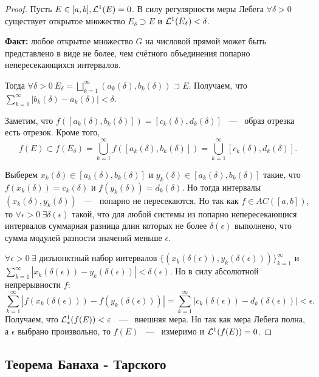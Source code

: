 \begin{proof}
    Пусть $E \in [a, b], \mathcal{L}^1(E) = 0$. В силу регулярности меры Лебега $\forall \delta > 0$ существует открытое множество $E_{\delta} \supset E$ и $\mathcal{L}^1(E_\delta) < \delta$. 

    \noindent \textbf{Факт:} любое открытое множество $G$ на числовой прямой может быть представлено в виде не более, чем счётного объединения попарно непересекающихся интервалов. 

    \noindent Тогда $\forall \delta > 0 \  E_{\delta} = \bigsqcup\limits_{k = 1}^{\infty} (a_k(\delta), b_k(\delta)) \supset E$. Получаем, что $\sum\limits_{k = 1}^{\infty} |b_k(\delta) - a_k(\delta)| < \delta$.

    \noindent Заметим, что $f([a_k(\delta), b_k(\delta)]) = [c_k(\delta), d_k(\delta)]$ ~---~ образ отрезка есть отрезок. Кроме того, $$f(E) \subset f(E_{\delta}) = \bigcup\limits_{k = 1}^{\infty} f([a_k(\delta), b_k(\delta)]) = \bigcup\limits_{k = 1}^{\infty} [c_k(\delta), d_k(\delta)].$$  

    \noindent Выберем $x_k(\delta) \in [a_k(\delta), b_k(\delta)]$ и $y_k(\delta) \in [a_k(\delta), b_k(\delta)]$ такие, что $f(x_k(\delta)) = c_k(\delta)$ и $f(y_k(\delta)) = d_k(\delta)$. Но тогда интервалы $(x_k(\delta), y_k(\delta))$ ~---~ попарно не пересекаются. Но так как $f \in AC([a, b])$, то $\forall \epsilon > 0 \ \exists \delta(\epsilon)$ такой, что для любой системы из попарно непересекающися интервалов суммарная разница длин которых не более $\delta(\epsilon)$ выполнено, что сумма модулей разности значений меньше $\epsilon$. 

     \noindent $\forall \epsilon > 0 \ \exists$ дизъюнктный набор интервалов $\{(x_k(\delta(\epsilon)), y_k(\delta(\epsilon)))\}_{k = 1}^{\infty}$ и $\sum\limits_{k = 1}^{\infty} \left|x_k(\delta(\epsilon)) - y_k(\delta(\epsilon))\right| < \delta(\epsilon)$. Но в силу абсолютной непрерывности $f$:  $$\sum\limits_{k = 1}^{\infty} |f(x_k(\delta(\epsilon))) - f(y_k(\delta(\epsilon)))| = \sum\limits_{k = 1}^{\infty} |c_k(\delta(\epsilon)) - d_k(\delta(\epsilon))| < \epsilon.$$ Получаем, что $\mathcal{L}^{1}_{*}(f(E)) < \varepsilon$ ~---~ внешняя мера. Но так как мера Лебега полна, а $\epsilon$ выбрано произвольно, то $f(E)$ ~---~ измеримо и $\mathcal{L}^1(f(E)) = 0$.  
\end{proof}

\subsection{Теорема Банаха - Тарского}

